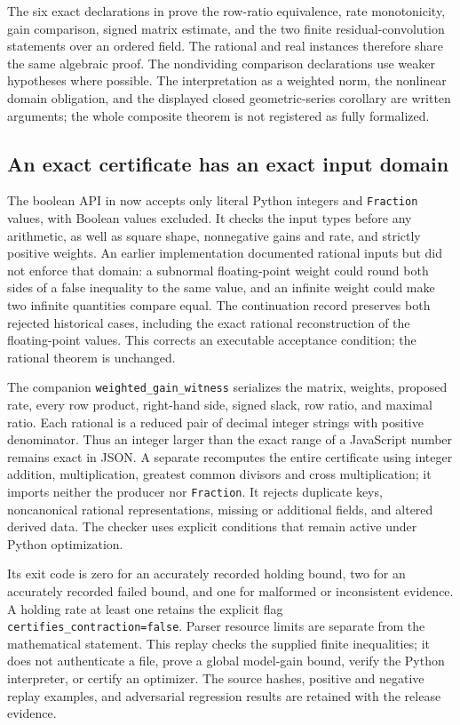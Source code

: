 The six exact declarations in 
prove the row-ratio equivalence, rate monotonicity, gain comparison,
signed matrix estimate, and the two finite residual-convolution statements
over an ordered field. The rational and real instances therefore share
the same algebraic proof. The nondividing comparison declarations use
weaker hypotheses where possible. The interpretation as a weighted norm,
the nonlinear domain obligation, and the displayed closed geometric-series
corollary are written arguments; the whole composite theorem is not
registered as fully formalized.

\subsection{An exact certificate has an exact input domain}

The boolean API in 
now accepts only literal Python integers and \texttt{Fraction} values,
with Boolean values excluded. It checks the input types before any
arithmetic, as well as square shape, nonnegative gains and rate, and
strictly positive weights. An earlier implementation documented rational
inputs but did not enforce that domain: a subnormal floating-point weight
could round both sides of a false inequality to the same value, and an
infinite weight could make two infinite quantities compare equal. The
continuation record preserves both rejected historical cases, including
the exact rational reconstruction of the floating-point values. This
corrects an executable acceptance condition; the rational theorem is
unchanged.

The companion \texttt{weighted\_gain\_witness} serializes the matrix,
weights, proposed rate, every row product, right-hand side, signed slack,
row ratio, and maximal ratio. Each rational is a reduced pair of decimal
integer strings with positive denominator. Thus an integer larger than
the exact range of a JavaScript number remains exact in JSON. A separate
 recomputes the entire certificate
using integer addition, multiplication, greatest common divisors and
cross multiplication; it imports neither the producer nor
\texttt{Fraction}. It rejects duplicate keys, noncanonical rational
representations, missing or additional fields, and altered derived data.
The checker uses explicit conditions that remain active under Python
optimization.

Its exit code is zero for an accurately recorded holding bound, two for
an accurately recorded failed bound, and one for malformed or inconsistent
evidence. A holding rate at least one retains the explicit flag
\texttt{certifies\_contraction=false}. Parser resource limits are separate
from the mathematical statement. This replay checks the supplied finite
inequalities; it does not authenticate a file, prove a global model-gain
bound, verify the Python interpreter, or certify an optimizer. The source
hashes, positive and negative replay examples, and adversarial regression
results are retained with the release evidence.

